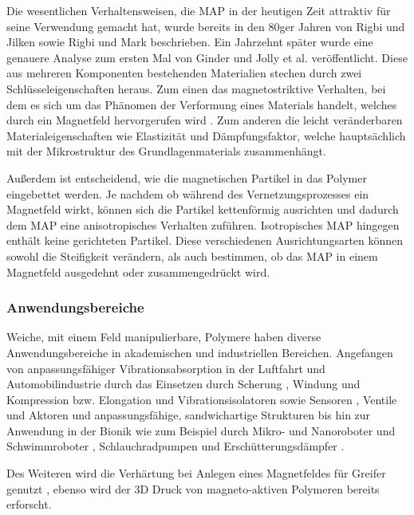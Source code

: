 Die wesentlichen Verhaltensweisen, die MAP in der heutigen Zeit attraktiv für seine Verwendung gemacht hat, wurde bereits in den 80ger Jahren von Rigbi und Jilken \cite{Rigbi1} sowie Rigbi und Mark \cite{Rigbi2} beschrieben. Ein Jahrzehnt später wurde eine genauere Analyse zum ersten Mal von Ginder und Jolly et al. \cite{ginder} veröffentlicht. 
Diese aus mehreren Komponenten bestehenden Materialien stechen durch zwei Schlüsseleigenschaften heraus. 
Zum einen das magnetostriktive Verhalten, bei dem es sich um das Phänomen der Verformung eines Materials handelt, welches durch ein Magnetfeld hervorgerufen wird \cite{Martin_2006}.
Zum anderen die leicht veränderbaren Materialeigenschaften wie Elastizität und Dämpfungsfaktor, welche hauptsächlich mit der Mikrostruktur des Grundlagenmaterials zusammenhängt. \cite{Varga1} \cite{Varga2}

Außerdem ist entscheidend, wie die magnetischen Partikel in das Polymer eingebettet werden. Je nachdem ob während des Vernetzungsprozesses ein Magnetfeld wirkt, können sich die Partikel kettenförmig ausrichten und dadurch dem MAP eine anisotropisches Verhalten zuführen. Isotropisches MAP hingegen enthält keine gerichteten Partikel. Diese verschiedenen Ausrichtungsarten können sowohl die Steifigkeit verändern, als auch bestimmen, ob das MAP in einem Magnetfeld ausgedehnt oder zusammengedrückt wird. 

\subsubsection*{Anwendungsbereiche}
Weiche, mit einem Feld manipulierbare, Polymere haben diverse Anwendungsbereiche in akademischen und industriellen Bereichen. Angefangen von anpassungsfähiger Vibrationsabsorption in der Luftfahrt und Automobilindustrie durch das Einsetzen durch Scherung \cite{Ginder_Schlotter_Nichols} \cite{Deng_Gong}, Windung \cite{Hoang_Zhang_Li_Du} und Kompression bzw. Elongation \cite{Kallio_2007} und Vibrationsisolatoren \cite{Ginder_2000} sowie Sensoren \cite{Ginder_2000} \cite{Martin_2006}, Ventile und Aktoren \cite{Boese_2012} \cite{Keip_2014} und anpassungsfähige, sandwichartige Strukturen \cite{Zhou_2005} \cite{Zhou_2006} \cite{Wei_2008} bis hin zur Anwendung in der Bionik wie zum Beispiel durch Mikro- und Nanoroboter und Schwimmroboter \cite{Qiu_2015} \cite{Xu_2015} \cite{Lum_2016} \cite{Hu_2018}, Schlauchradpumpen \cite{Fuhrer_2013} und Erschütterungsdämpfer \cite{Li_2013}.

Des Weiteren wird die Verhärtung bei Anlegen eines Magnetfeldes für Greifer genutzt \cite{Qi_2020}, ebenso wird der 3D Druck von magneto-aktiven Polymeren \cite{Sindersberger_2018} bereits erforscht.

